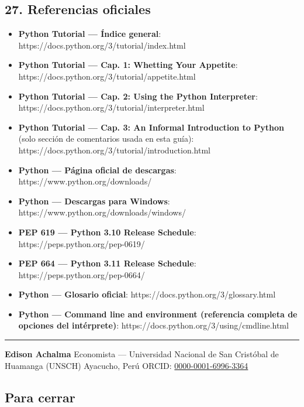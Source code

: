 \documentclass[
  doc,
  floatsintext,
  longtable,
  a4paper,
  nolmodern,
  notxfonts,
  notimes,
  12pt,
  colorlinks=true,linkcolor=blue,citecolor=blue,urlcolor=blue]{apa7}
\providecommand{\tightlist}{%
  \setlength{\itemsep}{0pt}\setlength{\parskip}{0pt}}
\begin{document}
\subsection{27. Referencias oficiales}\label{referencias-oficiales}

\begin{itemize}
\tightlist
\item
  \textbf{Python Tutorial --- Índice general}:
  https://docs.python.org/3/tutorial/index.html
\item
  \textbf{Python Tutorial --- Cap. 1: Whetting Your Appetite}:
  https://docs.python.org/3/tutorial/appetite.html
\item
  \textbf{Python Tutorial --- Cap. 2: Using the Python Interpreter}:
  https://docs.python.org/3/tutorial/interpreter.html
\item
  \textbf{Python Tutorial --- Cap. 3: An Informal Introduction to
  Python} (solo sección de comentarios usada en esta guía):
  https://docs.python.org/3/tutorial/introduction.html
\item
  \textbf{Python --- Página oficial de descargas}:
  https://www.python.org/downloads/
\item
  \textbf{Python --- Descargas para Windows}:
  https://www.python.org/downloads/windows/
\item
  \textbf{PEP 619 --- Python 3.10 Release Schedule}:
  https://peps.python.org/pep-0619/
\item
  \textbf{PEP 664 --- Python 3.11 Release Schedule}:
  https://peps.python.org/pep-0664/
\item
  \textbf{Python --- Glosario oficial}:
  https://docs.python.org/3/glossary.html
\item
  \textbf{Python --- Command line and environment (referencia completa
  de opciones del intérprete)}:
  https://docs.python.org/3/using/cmdline.html
\end{itemize}

\begin{center}\rule{0.5\linewidth}{0.5pt}\end{center}

\textbf{Edison Achalma} Economista --- Universidad Nacional de San
Cristóbal de Huamanga (UNSCH) Ayacucho, Perú ORCID:
\href{https://orcid.org/0000-0001-6996-3364}{0000-0001-6996-3364}

\subsection{Para cerrar}\label{para-cerrar}
\end{document}
